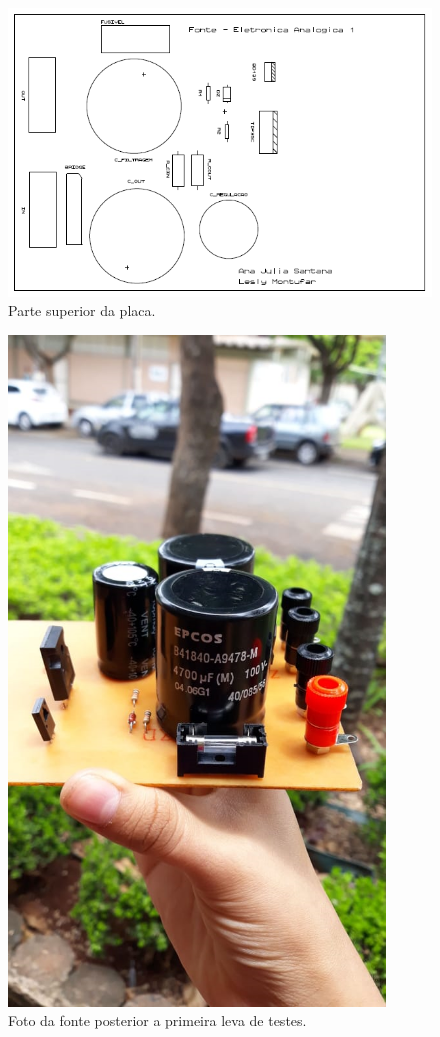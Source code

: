 \documentclass[a4paper,12pt,oneside,openany,table,xcdraw]{article}
\begin{document}
\begin{figure}[H]
\centering
\captionsetup{font=scriptsize}
\includegraphics[width=15cm]{top}
\caption{Parte superior da placa.}
\label{top}
\end{figure}

\begin{figure}[H]
\centering
\captionsetup{font=scriptsize}
\includegraphics[width=10cm]{foto}
\caption{Foto da fonte posterior a primeira leva de testes.}
\label{foto}
\end{figure}
\end{document}
